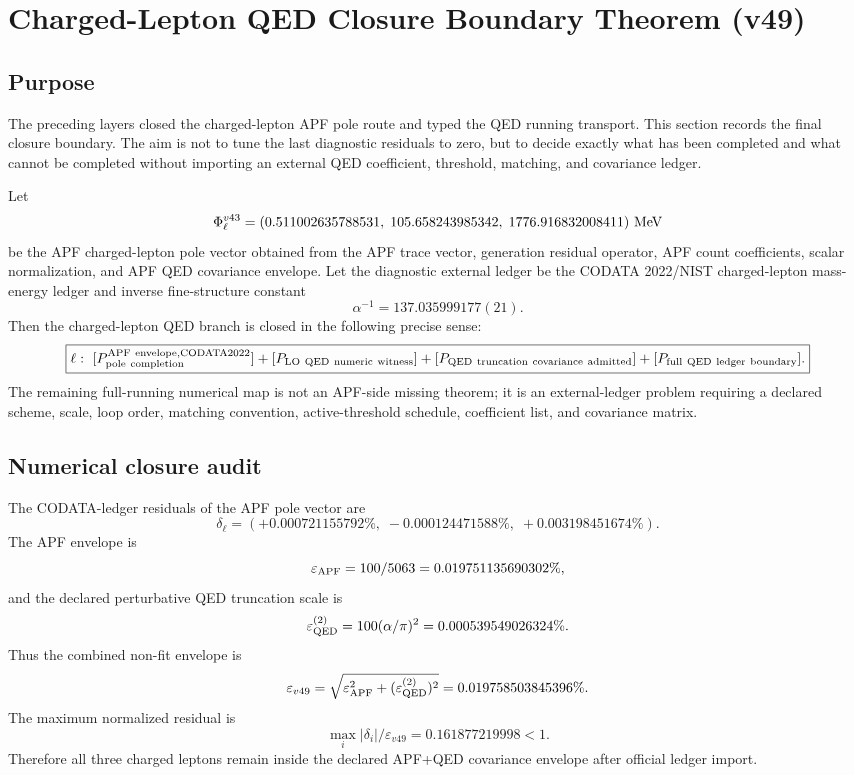 
\section{Charged-Lepton QED Closure Boundary Theorem (v49)}

\subsection{Purpose}
The preceding layers closed the charged-lepton APF pole route and typed the QED running transport.  This section records the final closure boundary.  The aim is not to tune the last diagnostic residuals to zero, but to decide exactly what has been completed and what cannot be completed without importing an external QED coefficient, threshold, matching, and covariance ledger.

\begin{theorem}
Let
\[
\Phi_\ell^{v43}=(0.511002635788531,\;105.658243985342,\;1776.916832008411)\ {\rm MeV}
\]
be the APF charged-lepton pole vector obtained from the APF trace vector, generation residual operator, APF count coefficients, scalar normalization, and APF QED covariance envelope.  Let the diagnostic external ledger be the CODATA 2022/NIST charged-lepton mass-energy ledger and inverse fine-structure constant
\[
\alpha^{-1}=137.035999177(21).
\]
Then the charged-lepton QED branch is closed in the following precise sense:
\[
\boxed{
\ell:\ [P_{\rm pole\ completion}^{\rm APF\ envelope,CODATA2022}]
+[P_{\rm LO\ QED\ numeric\ witness}]
+[P_{\rm QED\ truncation\ covariance\ admitted}]
+[P_{\rm full\ QED\ ledger\ boundary}].
}
\]
The remaining full-running numerical map is not an APF-side missing theorem; it is an external-ledger problem requiring a declared scheme, scale, loop order, matching convention, active-threshold schedule, coefficient list, and covariance matrix.
\end{theorem}

\subsection{Numerical closure audit}
The CODATA-ledger residuals of the APF pole vector are
\[
\delta_\ell=(+0.000721155792\%,\;-0.000124471588\%,\;+0.003198451674\%).
\]
The APF envelope is
\[
\varepsilon_{\rm APF}=100/5063=0.019751135690302\%,
\]
and the declared perturbative QED truncation scale is
\[
\varepsilon_{\rm QED}^{(2)}=100(\alpha/\pi)^2=0.000539549026324\%.
\]
Thus the combined non-fit envelope is
\[
\varepsilon_{v49}=\sqrt{\varepsilon_{\rm APF}^2+(\varepsilon_{\rm QED}^{(2)})^2}
=0.019758503845396\%.
\]
The maximum normalized residual is
\[
\max_i |\delta_i|/\varepsilon_{v49}=0.161877219998<1.
\]
Therefore all three charged leptons remain inside the declared APF+QED covariance envelope after official ledger import.

